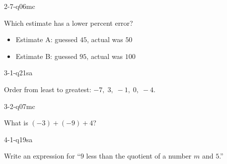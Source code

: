 \begin{practiceQuestion}{2-7-q06}{mc}
\begin{questionText}
Which estimate has a lower percent error?
\begin{itemize}
    \item Estimate A: guessed $45$, actual was $50$
    \item Estimate B: guessed $95$, actual was $100$
\end{itemize}
\end{questionText}
\end{practiceQuestion}

\begin{practiceQuestion}{3-1-q21}{sa}
\begin{questionText}
Order from least to greatest: $-7, \; 3, \; -1, \; 0, \; -4$.
\end{questionText}
\end{practiceQuestion}

\begin{practiceQuestion}{3-2-q07}{mc}
\begin{questionText}
What is $(-3) + (-9) + 4$?
\end{questionText}
\end{practiceQuestion}

\begin{practiceQuestion}{4-1-q19}{sa}
\begin{questionText}
Write an expression for ``$9$ less than the quotient of a number $m$ and $5$.''
\end{questionText}
\end{practiceQuestion}

